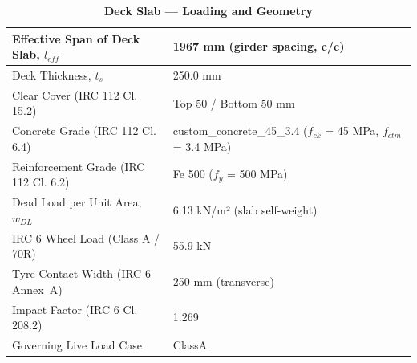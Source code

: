 \documentclass[12pt,a4paper]{report}
\numberwithin{table}{chapter}
\numberwithin{figure}{chapter}
\begin{document}
\vspace{1em}
\begin{longtable}{|L{5.5cm}|p{10.0cm}|}
\caption{\textbf{Deck Slab --- Loading and Geometry}}
\hline
\textnormal{Effective Span of Deck Slab, $l_{eff}$} & 1967 mm (girder spacing, c/c) \\[6pt]
\hline
\textnormal{Deck Thickness, $t_s$} & 250.0 mm \\[6pt]
\hline
\textnormal{Clear Cover (IRC 112 Cl. 15.2)} & Top 50 / Bottom 50 mm \\[6pt]
\hline
\textnormal{Concrete Grade (IRC 112 Cl. 6.4)} & custom\_\allowbreak{}concrete\_\allowbreak{}45\_\allowbreak{}3.4 ($f_{ck}$ = 45 MPa, $f_{ctm}$ = 3.4 MPa) \\[6pt]
\hline
\textnormal{Reinforcement Grade (IRC 112 Cl. 6.2)} & Fe 500 ($f_y$ = 500 MPa) \\[6pt]
\hline
\textnormal{Dead Load per Unit Area, $w_{DL}$} & 6.13 kN/m² (slab self-weight) \\[6pt]
\hline
\textnormal{IRC 6 Wheel Load (Class A / 70R)} & 55.9 kN \\[6pt]
\hline
\textnormal{Tyre Contact Width (IRC 6 Annex~A)} & 250 mm (transverse) \\[6pt]
\hline
\textnormal{Impact Factor (IRC 6 Cl. 208.2)} & 1.269 \\[6pt]
\hline
\textnormal{Governing Live Load Case} & ClassA \\[6pt]
\hline
\end{longtable}
\end{document}
